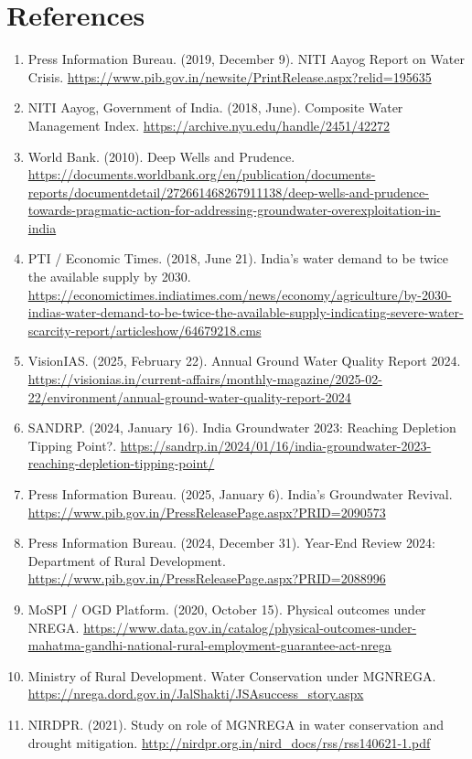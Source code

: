 \documentclass[12pt,a4paper]{report}
\begin{document}
\chapter*{References}
\begin{enumerate}
  \item Press Information Bureau. (2019, December 9). NITI Aayog Report on Water Crisis. \url{https://www.pib.gov.in/newsite/PrintRelease.aspx?relid=195635}
  \item NITI Aayog, Government of India. (2018, June). Composite Water Management Index. \url{https://archive.nyu.edu/handle/2451/42272}
  \item World Bank. (2010). Deep Wells and Prudence. \url{https://documents.worldbank.org/en/publication/documents-reports/documentdetail/272661468267911138/deep-wells-and-prudence-towards-pragmatic-action-for-addressing-groundwater-overexploitation-in-india}
  \item PTI / Economic Times. (2018, June 21). India’s water demand to be twice the available supply by 2030. \url{https://economictimes.indiatimes.com/news/economy/agriculture/by-2030-indias-water-demand-to-be-twice-the-available-supply-indicating-severe-water-scarcity-report/articleshow/64679218.cms}
  \item VisionIAS. (2025, February 22). Annual Ground Water Quality Report 2024. \url{https://visionias.in/current-affairs/monthly-magazine/2025-02-22/environment/annual-ground-water-quality-report-2024}
  \item SANDRP. (2024, January 16). India Groundwater 2023: Reaching Depletion Tipping Point?. \url{https://sandrp.in/2024/01/16/india-groundwater-2023-reaching-depletion-tipping-point/}
  \item Press Information Bureau. (2025, January 6). India’s Groundwater Revival. \url{https://www.pib.gov.in/PressReleasePage.aspx?PRID=2090573}
  \item Press Information Bureau. (2024, December 31). Year-End Review 2024: Department of Rural Development. \url{https://www.pib.gov.in/PressReleasePage.aspx?PRID=2088996}
  \item MoSPI / OGD Platform. (2020, October 15). Physical outcomes under NREGA. \url{https://www.data.gov.in/catalog/physical-outcomes-under-mahatma-gandhi-national-rural-employment-guarantee-act-nrega}
  \item Ministry of Rural Development. Water Conservation under MGNREGA. \url{https://nrega.dord.gov.in/JalShakti/JSAsuccess_story.aspx}
  \item NIRDPR. (2021). Study on role of MGNREGA in water conservation and drought mitigation. \url{http://nirdpr.org.in/nird_docs/rss/rss140621-1.pdf}

\end{enumerate}
\end{document}

